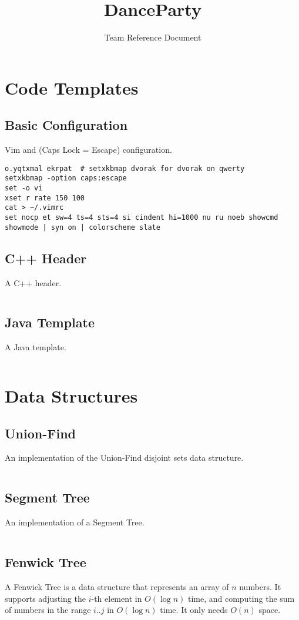 \documentclass[9pt,a4paper]{amsart}
\title{DanceParty}
\subtitle{Team Reference Document}
\newcommand{\code}[1]{\inputminted[linenos]{cpp}{_code/#1}}
\begin{document}
\maketitle
\thispagestyle{fancy}
\tableofcontents
\newpage

\section{Code Templates}
    \subsection{Basic Configuration}
        Vim and (Caps Lock = Escape) configuration.
        \begin{verbatim}
o.yqtxmal ekrpat  # setxkbmap dvorak for dvorak on qwerty
setxkbmap -option caps:escape
set -o vi
xset r rate 150 100
cat > ~/.vimrc
set nocp et sw=4 ts=4 sts=4 si cindent hi=1000 nu ru noeb showcmd showmode | syn on | colorscheme slate
        \end{verbatim}

    \subsection{C++ Header}
        A C++ header.
        \code{header.cpp}

    \subsection{Java Template}
        A Java template.
        \code{template.java}


\section{Data Structures}

    \subsection{Union-Find}
        An implementation of the Union-Find disjoint sets data structure.
        \code{data-structures/union_find.cpp}

    \subsection{Segment Tree}
        An implementation of a Segment Tree.
        \code{data-structures/segment_tree.cpp}

    \subsection{Fenwick Tree}
        A Fenwick Tree is a data structure that represents an array of $n$
        numbers. It supports adjusting the $i$-th element in $O(\log n)$ time,
        and computing the sum of numbers in the range $i..j$ in $O(\log n)$
        time. It only needs $O(n)$ space.
        \code{data-structures/fenwick_tree.cpp}
\end{document}
